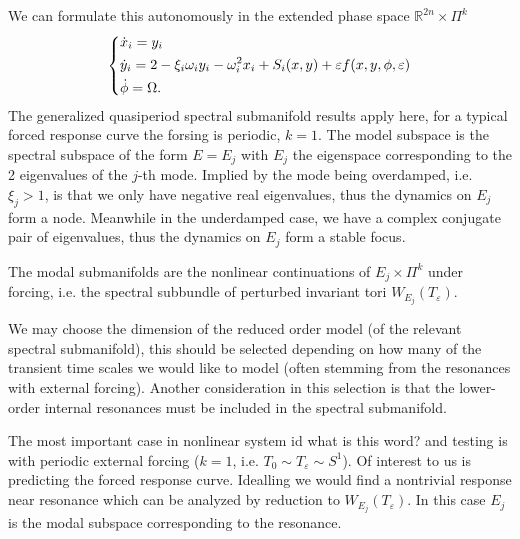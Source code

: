 We can formulate this autonomously in the extended phase space $\mathbb{R}^{2n}\times \Pi^{k}$ 
\begin{align}
	\begin{dcases}
		\dot{x}_i = y_i \\
		\dot{y}_i = 2- \xi_i \omega_i y_i - \omega_i^2 x_i + S_i(x,y) +\varepsilon f(x,y,\phi, \varepsilon)\\
		\dot{\phi} = \Omega.
	\end{dcases}
\end{align}
The generalized quasiperiod spectral submanifold results apply here, for a typical forced response curve the forsing is periodic, $k=1$. The model subspace is the spectral subspace of the form $E=E_j$ with $E_j$ the eigenspace corresponding to the 2 eigenvalues of the $j$-th mode. Implied by the mode being overdamped, i.e. $\xi_j>1$, is that we only have negative real eigenvalues, thus the dynamics on $E_j$ form a node. Meanwhile in the underdamped case, we have a complex conjugate pair of eigenvalues, thus the dynamics on $E_j$ form a stable focus.  

The modal submanifolds are the nonlinear continuations of $E_j \times \Pi^{k}$ under forcing, i.e. the spectral subbundle of perturbed invariant tori $W_{E_j}(T_{\varepsilon})$. 


We may choose the dimension of the reduced order model (of the relevant spectral submanifold), this should be selected depending on how many of the transient time scales we would like to model (often stemming from the resonances with external forcing). Another consideration in this selection is that the lower-order internal resonances must be included in the spectral submanifold.

The most important case in nonlinear system id {\color{blue} what is this word?} and testing is with periodic external forcing ($k=1$, i.e. $T_0 \sim T_{\varepsilon} \sim S^1$). Of interest to us is predicting the forced response curve. Idealling we would find a nontrivial response near resonance which can be analyzed by reduction to $W_{E_j}(T_{\varepsilon})$. In this case $E_j$ is the modal subspace corresponding to the resonance.

